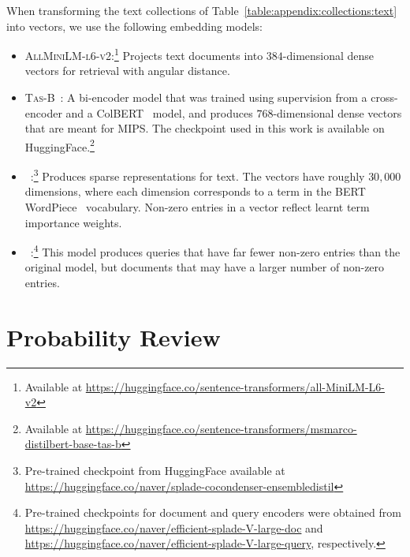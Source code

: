 When transforming the text collections of Table~\ref{table:appendix:collections:text}
into vectors, we use the following embedding models:
\begin{itemize}
    \item \textsc{AllMiniLM-l6-v2}:\footnote{Available at \url{https://huggingface.co/sentence-transformers/all-MiniLM-L6-v2}}
    Projects text documents into $384$-dimensional dense vectors for retrieval with angular distance.

    \item \textsc{Tas-B}~\citep{tas-b}: A bi-encoder model that was trained using supervision from a cross-encoder and a ColBERT~\citep{colbert2020khattab} model,
    and produces $768$-dimensional dense vectors that are meant for MIPS.
    The checkpoint used in this work is available on HuggingFace.\footnote{Available at \url{https://huggingface.co/sentence-transformers/msmarco-distilbert-base-tas-b}}

    \item \splade{}~\citep{formal2022splade}:\footnote{Pre-trained checkpoint from HuggingFace available at \url{https://huggingface.co/naver/splade-cocondenser-ensembledistil}}
    Produces sparse representations for text.
    The vectors have roughly $30{,}000$ dimensions, where each dimension corresponds
    to a term in the BERT~\citep{devlin2019bert} WordPiece~\citep{wordpiece} vocabulary.
    Non-zero entries in a vector reflect learnt term importance weights.

    \item \esplade{}~\citep{lassance2022sigir}:\footnote{Pre-trained checkpoints for document and
    query encoders were obtained from \url{https://huggingface.co/naver/efficient-splade-V-large-doc} and \url{https://huggingface.co/naver/efficient-splade-V-large-query},
    respectively.}
    This model produces queries that have far fewer non-zero entries than the original
    \splade{} model, but documents that may have a larger number of non-zero entries.
\end{itemize}





\chapter{Probability Review}
\label{appendix:probability}


